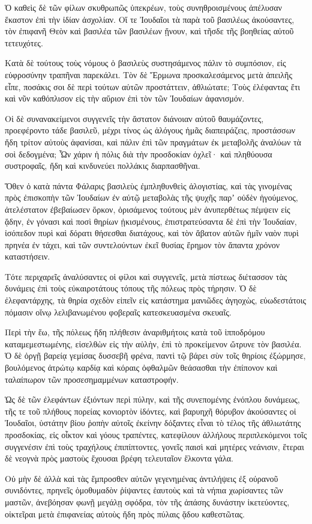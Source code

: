 {Ὁ καθεὶς δὲ τῶν φίλων σκυθρωπῶς ὑπεκρέων, τοὺς συνηθροισμένους ἀπέλυσαν ἕκαστον ἐπὶ τὴν ἰδίαν ἀσχολίαν.
Οἵ τε Ἰουδαῖοι τὰ παρὰ τοῦ βασιλέως ἀκούσαντες, τὸν ἐπιφανῆ Θεὸν καὶ βασιλέα τῶν βασιλέων ᾔνουν, καὶ τῆσδε τῆς βοηθείας αὐτοῦ τετευχότες.
\par }{\PP {}Κατὰ δὲ τούτους τοὺς νόμους ὁ βασιλεὺς συστησάμενος πάλιν τὸ συμπόσιον, εἰς εὐφροσύνην τραπῆναι παρεκάλει.
Τὸν δὲ Ἕρμωνα προσκαλεσάμενος μετὰ ἀπειλῆς εἶπε, ποσάκις σοι δὲ περὶ τούτων αὐτῶν προστάττειν, ἀθλιώτατε;
Τοὺς ἐλέφαντας ἔτι καὶ νῦν καθόπλισον εἰς τὴν αὔριον ἐπὶ τὸν τῶν Ἰουδαίων ἀφανισμόν.
\par }{\PP {}Οἱ δὲ συνανακείμενοι συγγενεῖς τὴν ἄστατον διάνοιαν αὐτοῦ θαυμάζοντες, προεφέροντο τάδε
βασιλεῦ, μέχρι τίνος ὡς ἀλόγους ἡμᾶς διαπειράζεις, προστάσσων ἤδη τρίτον αὐτοὺς ἀφανίσαι, καὶ πάλιν ἐπὶ τῶν πραγμάτων ἐκ μεταβολῆς ἀναλύων τὰ σοὶ δεδογμένα;
Ὧν χάριν ἡ πόλις διὰ τὴν προσδοκίαν ὀχλεῖ· καὶ πληθύουσα συστροφαῖς, ἤδη καὶ κινδυνεύει πολλάκις διαρπασθῆναι.
\par }{\PP {}Ὅθεν ὁ κατὰ πάντα Φάλαρις βασιλεὺς ἐμπληθυνθεὶς ἀλογιστίας, καὶ τὰς γινομένας πρὸς ἐπισκοπὴν τῶν Ἰουδαίων ἐν αὐτῷ μεταβολὰς τῆς ψυχῆς παρʼ οὐδὲν ἡγούμενος, ἀτελέστατον ἐβεβαίωσεν ὅρκον, ὁρισάμενος τούτους μὲν ἀνυπερθέτως πέμψειν εἰς ᾅδην, ἐν γόνασι καὶ ποσὶ θηρίων ᾐκισμένους,
ἐπιστρατεύσαντα δὲ ἐπὶ τὴν Ἰουδαίαν, ἰσόπεδον πυρὶ καὶ δόρατι θήσεσθαι διατάχους, καὶ τὸν ἄβατον αὐτῶν ἡμῖν ναὸν πυρὶ πρηνέα ἐν τάχει, καὶ τῶν συντελούντων ἐκεῖ θυσίας ἔρημον τὸν ἅπαντα χρόνον καταστήσειν.
\par }{\PP {}Τότε περιχαρεῖς ἀναλύσαντες οἱ φίλοι καὶ συγγενεῖς, μετὰ πίστεως διέτασσον τὰς δυνάμεις ἐπὶ τοὺς εὐκαιροτάτους τόπους τῆς πόλεως πρὸς τήρησιν.
Ὁ δὲ ἐλεφαντάρχης, τὰ θηρία σχεδὸν εἰπεῖν εἰς κατάστημα μανιῶδες ἀγηοχὼς, εὐωδεστάτοις πόμασιν οἴνῳ λελιβανωμένου φοβεραῖς κατεσκευασμένα σκευαῖς.
\par }{\PP {}Περὶ τὴν ἕω, τῆς πόλεως ἤδη πλήθεσιν ἀναριθμήτοις κατὰ τοῦ ἱπποδρόμου καταμεμεστωμένης, εἰσελθὼν εἰς τὴν αὐλὴν, ἐπὶ τὸ προκείμενον ὤτρυνε τὸν βασιλέα.
Ὁ δὲ ὀργῇ βαρείᾳ γεμίσας δυσσεβῆ φρένα, παντὶ τῷ βάρει σὺν τοῖς θηρίοις ἐξώρμησε, βουλόμενος ἀτρώτῳ καρδίᾳ καὶ κόραις ὀφθαλμῶν θεάσασθαι τὴν ἐπίπονον καὶ ταλαίπωρον τῶν προσεσημαμμένων καταστροφήν.
\par }{\PP {}Ὡς δὲ τῶν ἐλεφάντων ἐξιόντων περὶ πύλην, καὶ τῆς συνεπομένης ἐνόπλου δυνάμεως, τῆς τε τοῦ πλήθους πορείας κονιορτὸν ἰδόντες, καὶ βαρυηχῆ θόρυβον ἀκούσαντες οἱ Ἰουδαῖοι,
ὑστάτην βίου ῥοπὴν αὐτοῖς ἐκείνην δόξαντες εἶναι τὸ τέλος τῆς ἀθλιωτάτης προσδοκίας, εἰς οἶκτον καὶ γόους τραπέντες, κατεφίλουν ἀλλήλους περιπλεκόμενοι τοῖς συγγενέσιν ἐπὶ τοὺς τραχήλους ἐπιπίπτοντες, γονεῖς παισὶ καὶ μητέρες νεάνισιν, ἕτεραι δὲ νεογνὰ πρὸς μαστοὺς ἔχουσαι βρέφη τελευταῖον ἕλκοντα γάλα.
\par }{\PP {}Οὐ μὴν δὲ ἀλλὰ καὶ τὰς ἔμπροσθεν αὐτῶν γεγενημένας ἀντιλήψεις ἐξ οὐρανοῦ συνιδόντες, πρηνεῖς ὁμοθυμαδὸν ῥίψαντες ἑαυτοὺς καὶ τὰ νήπια χωρίσαντες τῶν μαστῶν,
ἀνεβόησαν φωνῇ μεγάλῃ σφόδρα, τὸν τῆς ἁπάσης δυνάστην ἱκετεύοντες, οἰκτεῖραι μετὰ ἐπιφανείας αὐτοὺς ἤδη πρὸς πύλαις ᾅδου καθεστῶτας.

}
